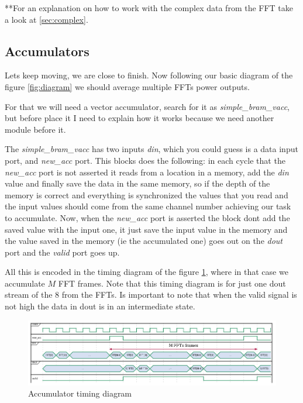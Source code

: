 **For an explanation on how to work with the complex data from the FFT take a look at \ref{sec:complex}.

\subsection{Accumulators}
Lets keep moving, we are close to finish. Now following our basic diagram of the figure \ref{fig:diagram} we should average multiple FFTs power outputs.


For that we will need a vector accumulator, search for it as \textit{simple\_bram\_vacc}, but before place it I need to explain how it works because we need another module before it.


The \textit{simple\_bram\_vacc} has two inputs \textit{din}, which you could guess is a data input port, and \textit{new\_acc} port. This blocks does the following: in each cycle that the \textit{new\_acc} port is not asserted it reads from a location in a memory, add the \textit{din} value and finally save the data in the same memory, so if the depth of the memory is correct and everything is synchronized the values that you read and the input values should come from the same channel number achieving our task to accumulate.
Now, when the \textit{new\_acc} port is asserted the block dont add the saved value with the input one, it just save the input value in the memory and the value saved in the memory (ie the accumulated one) goes out on the \textit{dout} port and the \textit{valid} port goes up.


All this is encoded in the timing diagram of the figure \ref{fig:acc_time}, where in that case we accumulate $M$ FFT frames. Note that this timing diagram is for just one dout stream of the 8 from the FFTs.
Is important to note that when the valid signal is not high the data in dout is in an intermediate state.

\begin{figure}
    \centering
    \includegraphics[scale=0.4]{images/acc_time.png}
    \caption{Accumulator timing diagram}
    \label{fig:acc_time}
\end{figure}

